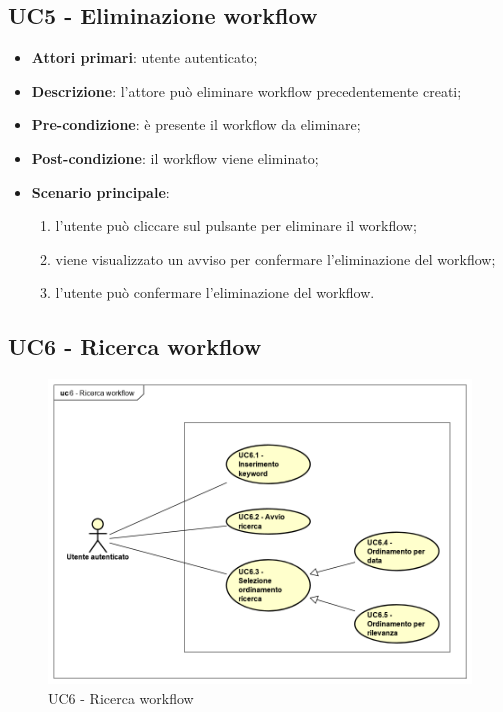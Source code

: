 \subsection{UC5 - Eliminazione workflow}

\begin{itemize}
\item \textbf{Attori primari}: utente autenticato;

\item \textbf{Descrizione}: l'attore può eliminare workflow precedentemente creati;

\item \textbf{Pre-condizione}: è presente il workflow da eliminare;

\item \textbf{Post-condizione}: il workflow viene eliminato;

\item \textbf{Scenario principale}:
\begin{enumerate}
\item l'utente può cliccare sul pulsante per eliminare il workflow;
\item viene visualizzato un avviso per confermare l'eliminazione del workflow;
\item l'utente può confermare l'eliminazione del workflow.
\end{enumerate}
\end{itemize}

\subsection{UC6 - Ricerca workflow}

\begin{figure}[H]
    \centering
    \includegraphics[scale=0.5]{immagini/UC6}
    \caption{UC6 - Ricerca workflow \label{fig:UC6}}
\end{figure}

